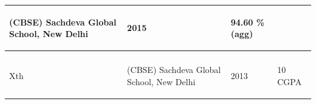 \documentclass[11pt]{article}
\begin{document}
\begin{center}
\begin{small}
\begin{tabular}{ |m{5.5cm} m{5.5cm} m{2cm} m{4.5cm}| }
\begin{center}
(CBSE) Sachdeva Global School, New Delhi

\end{center}&

\begin{center}

2015

\end{center}&

\begin{center}

94.60 \%(agg)

\end{center}\\

\hline

\begin{center}

AISSE\\

Xth

\end{center}&

\begin{center}

(CBSE) Sachdeva Global School, New Delhi

\end{center}&

\begin{center}

2013

\end{center}&

\begin{center}

10 CGPA

\end{center}\\

\hline

\end{tabular}
\end{small}
\end{center}
\end{document}
